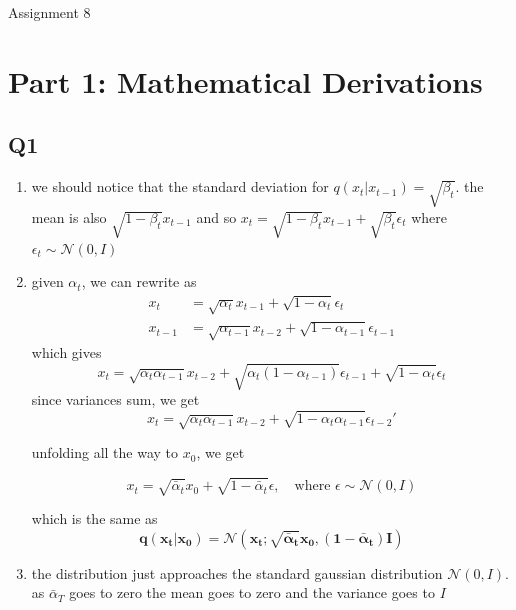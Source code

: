 \documentclass{report}
\begin{document}
\thispagestyle{empty}
\begin{center} \LARGE Assignment 8 \end{center}

\section*{Part 1: Mathematical Derivations}

\subsection*{Q1}
\begin{enumerate}
    \item we should notice that the standard deviation for \(q(x_t\vert x_{t-1} ) = \sqrt{\beta_t}\). the mean is also \(\sqrt{1-\beta_t}x_{t-1}\) and so \(x_t = \sqrt{1 - \beta_t} x_{t-1} + \sqrt{\beta_t} \epsilon_t\) where \( \epsilon_t \sim \mathcal{N}(0, I)\)
    \item given \(\alpha_t\), we can rewrite as 
    \begin{equation}
        \begin{split}
            x_t &= \sqrt{\alpha_t} x_{t-1} + \sqrt{1 - \alpha_t} \epsilon_t\\
            x_{t-1} &= \sqrt{\alpha_{t-1}} x_{t-2} + \sqrt{1 - \alpha_{t-1}} \epsilon_{t-1}
        \end{split}
    \end{equation}
    which gives 
    \begin{equation}
        x_t = \sqrt{\alpha_t \alpha_{t-1}} x_{t-2} + \sqrt{\alpha_t (1 - \alpha_{t-1})} \epsilon_{t-1} + \sqrt{1 - \alpha_t} \epsilon_t
    \end{equation}
    since variances sum, we get 
    \begin{equation}
        x_t = \sqrt{\alpha_t \alpha_{t-1}} x_{t-2} + \sqrt{1 - \alpha_t \alpha_{t-1}} \epsilon_{t-2}'
    \end{equation}

    unfolding all the way to \(x_0\), we get

    \begin{equation}
        x_t = \sqrt{\bar{\alpha}_t} x_0 + \sqrt{1 - \bar{\alpha}_t} \epsilon, \quad \text{where } \epsilon \sim \mathcal{N}(0, I)
    \end{equation}

    which is the same as 
    $$\mathbf{q(x_t | x_0) = \mathcal{N}\left(x_t; \sqrt{\bar{\alpha}_t} x_0, (1 - \bar{\alpha}_t) I\right)}$$

    \item the distribution just approaches the standard gaussian distribution \(\mathcal N(0,I)\). as \(\bar\alpha_T\) goes to zero the mean goes to zero and the variance goes to \(I\)

\end{enumerate}
\end{document}
